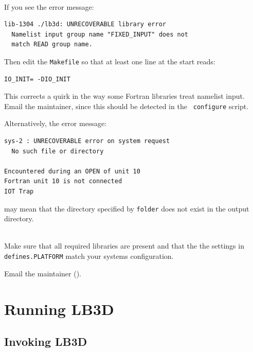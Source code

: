 \documentclass[a4paper]{article}
\begin{document}
\begin{description}

{\item [ The program fails on startup. ]
\ \\

If you see the error message:

\begin{verbatim}
lib-1304 ./lb3d: UNRECOVERABLE library error 
  Namelist input group name "FIXED_INPUT" does not
  match READ group name.
\end{verbatim}

Then edit the {\tt Makefile} so that at least one line at the start
reads:

\begin{verbatim}
IO_INIT= -DIO_INIT
\end{verbatim}

This corrects a quirk in the way some Fortran libraries treat namelist
input. Email the maintainer, since this should be detected in the {\tt
configure} script.

Alternatively, the error message:

\begin{verbatim}
sys-2 : UNRECOVERABLE error on system request 
  No such file or directory

Encountered during an OPEN of unit 10
Fortran unit 10 is not connected
IOT Trap
\end{verbatim}

may mean that the directory specified by {\tt folder} does not exist in the
output directory.

}
{\item [ The compile fails. ]
\ \\

        Make sure that all required libraries are present and that the the settings in {\tt defines.PLATFORM} match your systems configuration.

        Email the maintainer (\maintainer).
}

\end{description}





\newpage
\section{Running LB3D}

\subsection{Invoking LB3D}
\end{document}

